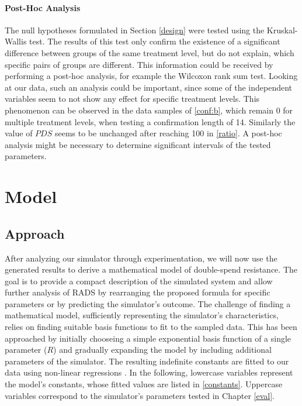 \documentclass[a4paper,12pt,twoside]{report}
\begin{document}
\subsubsection{Post-Hoc Analysis}
The null hypotheses formulated in Section \ref{design} were tested using the Kruskal-Wallis test. The results of this test only confirm the existence of a significant difference between groups of the same treatment level, but do not explain, which specific pairs of groups are different. This information could be received by performing a post-hoc analysis, for example the Wilcoxon rank sum test. Looking at our data, such an analysis could be important, since some of the independent variables seem to not show any effect for specific treatment levels. This phenomenon can be observed in the data samples of \autoref{conf:b}, which remain 0 for multiple treatment levels, when testing a confirmation length of 14. Similarly the value of $PDS$ seems to be unchanged after reaching 100 in \autoref{ratio}. A post-hoc analysis might be necessary to determine significant intervals of the tested parameters.


\chapter{Model}
\section{Approach}
After analyzing our simulator through experimentation, we will now use the generated results to derive a mathematical model of double-spend resistance. The goal is to provide a compact description of the simulated system and allow further analysis of RADS by rearranging the proposed formula for specific parameters or by predicting the simulator's outcome. The challenge of finding a mathematical model, sufficiently representing the simulator's characteristics, relies on finding suitable basis functions to fit to the sampled data. This has been approached by initially chooseing a simple exponential basis function of a single parameter ($R$) and gradually expanding the model by including additional parameters of the simulator.  The resulting indefinite constants are fitted to our data using non-linear regressions \cite{nlxb}. In the following, lowercase variables represent the model's constants, whose fitted values are listed in \autoref{constants}. Uppercase variables correspond to the simulator's parameters tested in Chapter \ref{eval}. 
\end{document}
